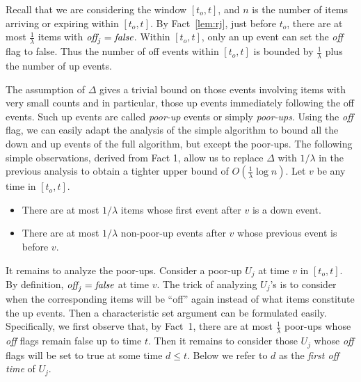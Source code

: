 \documentclass[proceedings]{stacs}
\theoremstyle{definition}\newtheorem{fact}{Fact}
\newcommand{\off}{\mbox{\it off}_{j}}
\newcommand{\false}{\mbox{\it false}}
\begin{document}
  {
Recall that we are considering the window $[t_o,t]$, and
$n$ is the number of items arriving or expiring within $[t_o,t]$.}
By Fact~\ref{lem:rj},
just before $t_o$,
there are at most $\frac{1}{\lambda}$ items with $\off = \false$.
Within $[t_o, t]$, only an up event can set the {\em off}\/ flag
to false.
Thus the number of off events within  $[t_o, t]$
is bounded by $\frac{1}{\lambda}$ plus the number of up events.



\vspace{.5ex}
The assumption of $\Delta$ gives a trivial bound on
 those events involving  items with very small counts and in
particular, those up events immediately following the off events.
Such up events are called {\em poor-up} events or simply {\em poor-ups}.
Using the {\em off}\/ flag, we can easily adapt
the analysis of the simple algorithm to bound
all the down and up events of the full algorithm,
but except the poor-ups. The following simple
observations, derived from Fact 1, allow us to replace
$\Delta$ with $1/\lambda$ in the previous analysis
to obtain a tighter upper bound of
$O(\frac{1}{\lambda} \log n)$.  Let $v$ be any time in $[t_o,t]$.

\vspace{.5ex}
\begin{itemize}
\item
There are at most $1/\lambda$ items
whose first event after $v$ is a down event.
\vspace{.5ex}
\item
There are at most $1/\lambda$ non-poor-up
events after $v$ whose previous event is before $v$.
\end{itemize}
\vspace{.5ex}

It remains to analyze the poor-ups.
Consider a poor-up $U_j$ at time $v$ in $[t_o, t]$.
By definition, $\off = \false$ at time $v$.
The trick of analyzing $U_j$'s
is to consider when the corresponding
items will be ``off'' again instead
of what items constitute the up events.
Then a characteristic
set argument can be formulated easily.
Specifically, we first observe that,
by Fact~1, there are at most $\frac{1}{\lambda}$ poor-ups
whose {\em off}\/ flags remain false up to time $t$.
Then it remains to consider those $U_j$
whose {\em off}\/ flags will be set to true at some time $d \le t$.
Below we refer to $d$ as the \emph{first off time} of $U_j$.
\end{document}
